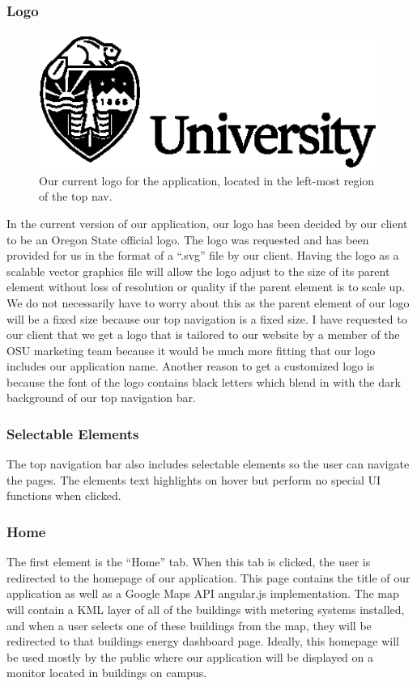 \documentclass[letterpaper,10pt,serif,draftclsnofoot,onecolumn,compsoc,titlepage]{IEEEtran}
\begin{document}
	\subsubsection{Logo}
    \begin{figure}[H]
      \centering
      \includegraphics[width=17cm]{images/logo.eps}
      \caption{Our current logo for the application, located in the left-most region of the top nav.}
    \end{figure}
		
  In the current version of our application, our logo has been decided by our client to be an Oregon State official logo. The logo was requested and has been provided for us 
  in the format of a ``.svg'' file by our client. Having the logo as a scalable vector graphics file will allow the logo adjust to the size of its parent element without loss 
  of resolution or quality if the parent element is to scale up. We do not necessarily have to worry about this as the parent element of our logo will be a fixed
  size because our top navigation is a fixed size. I have requested to our client that we get a logo that is tailored to our website by a member of the OSU marketing
  team because it would be much more fitting that our logo includes our application name. Another reason to get a customized logo is because the font of the logo contains
  black letters which blend in with the dark background of our top navigation bar.
		
		\subsubsection{Selectable Elements}
		The top navigation bar also includes selectable elements so the user can navigate the pages. The elements text highlights on hover but perform no special UI functions
		when clicked. 
			\subsubsection{Home}
			The first element is the ``Home'' tab. When this tab is clicked, the user is redirected to the homepage of our application. This page contains the title of our 
			application as well as a Google Maps API angular.js implementation. The map will contain a KML layer of all of the buildings with metering systems installed, and 
			when a user selects one of these buildings from the map, they will be redirected to that buildings energy dashboard page. Ideally, this homepage will be used
			mostly by the public where our application will be displayed on a monitor located in buildings on campus.
\end{document}
